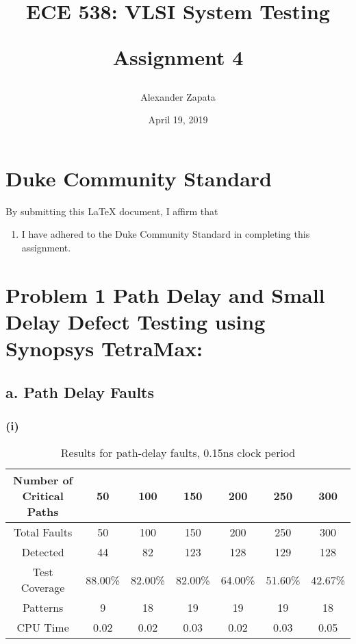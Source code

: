 \documentclass[letterpaper]{article} %
\begin{document}
\title{ECE 538: VLSI System Testing\\
\begin{large}{Assignment 4}\end{large}
\date{April 19, 2019}} %
\author{Alexander Zapata}
\maketitle


\vspace{12.0cm}
\section*{Duke Community Standard}

By submitting this \LaTeX{} document, I affirm that
\begin{enumerate}
    \item I have adhered to the Duke Community Standard in completing this assignment.
\end{enumerate}

\newpage 

\section*{Problem 1 {\small Path	Delay	and	Small	Delay	Defect	Testing	using	Synopsys	TetraMax:}}
\subsection*{a. Path Delay Faults}
\subsubsection*{(i)}
\begin{table}[ht]
\centering
\begin{tabular}{|c|c|c|c|c|c|c|}
\hline
Number of Critical Paths & 50      & 100     & 150     & 200     & 250     & 300     \\ \hline
Total Faults             & 50      & 100     & 150     & 200     & 250     & 300     \\ \hline
Detected                 & 44      & 82      & 123     & 128     & 129     & 128     \\ \hline
Test Coverage            & 88.00\% & 82.00\% & 82.00\% & 64.00\% & 51.60\% & 42.67\% \\ \hline
Patterns                 & 9       & 18      & 19      & 19      & 19      & 18      \\ \hline
CPU Time                 & 0.02    & 0.02    & 0.03    & 0.02    & 0.03    & 0.05    \\ \hline
\end{tabular}
\caption{Results for path-delay faults, 0.15ns clock period}
\end{table}
\end{document}
